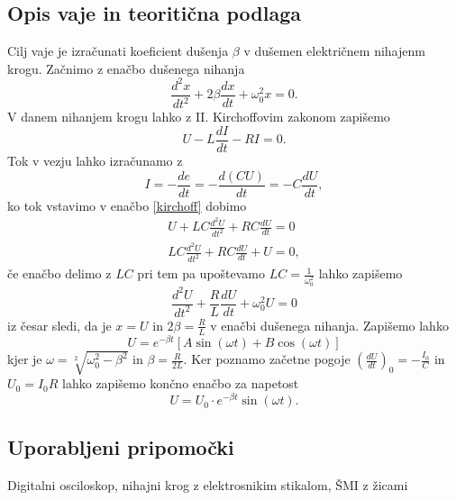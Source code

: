 \documentclass[12pt]{article}
\begin{document}
	\subsection*{Opis vaje in teoritična podlaga}
	Cilj vaje je izračunati koeficient dušenja $\beta$ v dušemen električnem nihajenm krogu.
	Začnimo z enačbo dušenega nihanja \cite{nihanje}
	\begin{equation}
		\frac{d^2 x}{dt^2} + 2\beta\frac{dx}{dt} + \omega_0^2 x =0 .
	\end{equation}
	V danem nihanjem krogu lahko z II. Kirchoffovim zakonom zapišemo
	\begin{equation}
		U - L\frac{dI}{dt} - RI = 0.
		\label{kirchoff}
	\end{equation}
	Tok v vezju lahko izračunamo z 
	\begin{equation}
		I = -\frac{de}{dt} = -\frac{d(CU)}{dt} = -C \frac{dU}{dt},
	\end{equation} ko tok vstavimo v enačbo \ref{kirchoff} dobimo
	\begin{equation}
		\begin{split}
			U + LC \frac{d^2U}{dt^2} + RC \frac{dU}{dt} = 0 \\
			LC \frac{d^2U}{dt^2} + RC \frac{dU}{dt} + U = 0,
		\end{split}
	\end{equation} če enačbo delimo z $LC$ pri tem pa upoštevamo $LC = \frac{1}{\omega_0^2}$ 
	lahko zapišemo
	\begin{equation}
		\frac{d^2U}{dt^2} + \frac{R}{L} \frac{dU}{dt} + \omega_0^2U = 0
	\end{equation} iz česar sledi, da je $x = U$ in $2\beta = \frac{R}{L}$ v enačbi dušenega
	nihanja. 
	Zapišemo lahko \cite{vaje}
	\begin{equation}
		U = e^{-\beta t}[A \sin(\omega t) + B \cos(\omega t)]
	\end{equation} kjer je $\omega = \sqrt[2]{\omega_0^2  - \beta^2}$ in $\beta = \frac{R}{2L}$.
	Ker poznamo začetne pogoje $(\frac{dU}{dt})_0 = - \frac{I_0}{C}$ in $U_0 = I_0 R$ lahko
	zapišemo končno enačbo za napetost
	\begin{equation}
		U = U_0 \cdot e^{-\beta t} \sin(\omega t).
	\end{equation}
	\subsection*{Uporabljeni pripomočki}
	Digitalni osciloskop, nihajni krog z elektrosnikim stikalom, ŠMI z žicami
\end{document}
